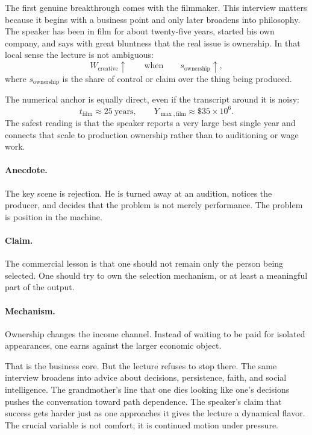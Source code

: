The first genuine breakthrough comes with the filmmaker. This interview matters because it begins with a business point and only later broadens into philosophy. The speaker has been in film for about twenty-five years, started his own company, and says with great bluntness that the real issue is ownership. In that local sense the lecture is not ambiguous:
\begin{equation}
W_{\text{creative}} \uparrow
\qquad \text{when} \qquad
s_{\text{ownership}} \uparrow,
\end{equation}
where \(s_{\text{ownership}}\) is the share of control or claim over the thing being produced.

The numerical anchor is equally direct, even if the transcript around it is noisy:
\begin{equation}
t_{\text{film}} \approx 25\ \text{years},
\qquad
Y_{\max,\text{film}} \approx \$35 \times 10^6.
\end{equation}
The safest reading is that the speaker reports a very large best single year and connects that scale to production ownership rather than to auditioning or wage work.

\paragraph{Anecdote.} The key scene is rejection. He is turned away at an audition, notices the producer, and decides that the problem is not merely performance. The problem is position in the machine.

\paragraph{Claim.} The commercial lesson is that one should not remain only the person being selected. One should try to own the selection mechanism, or at least a meaningful part of the output.

\paragraph{Mechanism.} Ownership changes the income channel. Instead of waiting to be paid for isolated appearances, one earns against the larger economic object.

That is the business core. But the lecture refuses to stop there. The same interview broadens into advice about decisions, persistence, faith, and social intelligence. The grandmother's line that one dies looking like one's decisions pushes the conversation toward path dependence. The speaker's claim that success gets harder just as one approaches it gives the lecture a dynamical flavor. The crucial variable is not comfort; it is continued motion under pressure.

